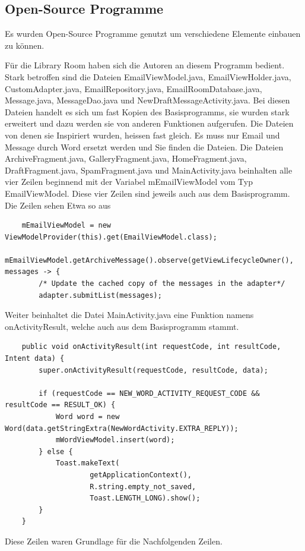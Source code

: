 \documentclass[a4paper,11pt]{article}
\begin{document}
\clearpage
\printglossary

\newpage
\printbibliography[heading=bibnumbered, title={Literaturverzeichnis}]

\begin{appendices}
\subsection{Open-Source Programme}
Es wurden Open-Source Programme genutzt um verschiedene Elemente einbauen zu können. 

Für die Library Room haben sich die Autoren an diesem Programm bedient. \cite{roomApp}
Stark betroffen sind die Dateien EmailViewModel.java, EmailViewHolder.java, CustomAdapter.java, EmailRepository.java, EmailRoomDatabase.java, Message.java, MessageDao.java
und NewDraftMessageActivity.java. Bei diesen
Dateien handelt es sich um fast Kopien des Basisprogramms, sie wurden stark erweitert und dazu werden sie von anderen Funktionen aufgerufen. 
Die Dateien von denen sie Inspiriert wurden, heissen fast gleich. Es muss nur Email und Message durch Word ersetzt werden und Sie finden die Dateien.
Die Dateien ArchiveFragment.java, GalleryFragment.java, HomeFragment.java, DraftFragment.java, SpamFragment.java und MainActivity.java beinhalten alle vier Zeilen beginnend mit der 
Variabel mEmailViewModel vom Typ EmailViewModel. Diese vier Zeilen sind jeweils auch aus dem Basisprogramm. 
Die Zeilen sehen Etwa so aus
\lstset{language=java}
\begin{lstlisting}
    mEmailViewModel = new ViewModelProvider(this).get(EmailViewModel.class);
    mEmailViewModel.getArchiveMessage().observe(getViewLifecycleOwner(), messages -> {
        /* Update the cached copy of the messages in the adapter*/
        adapter.submitList(messages);

\end{lstlisting}


Weiter beinhaltet die Datei MainActivity.java eine Funktion namens onActivityResult, welche auch aus dem Basisprogramm stammt. 
    \lstset{language=java}
    \begin{lstlisting}
    public void onActivityResult(int requestCode, int resultCode, Intent data) {
        super.onActivityResult(requestCode, resultCode, data);

        if (requestCode == NEW_WORD_ACTIVITY_REQUEST_CODE && resultCode == RESULT_OK) {
            Word word = new Word(data.getStringExtra(NewWordActivity.EXTRA_REPLY));
            mWordViewModel.insert(word);
        } else {
            Toast.makeText(
                    getApplicationContext(),
                    R.string.empty_not_saved,
                    Toast.LENGTH_LONG).show();
        }
    }
    \end{lstlisting}
Diese Zeilen waren Grundlage für die Nachfolgenden Zeilen.


\end{appendices}
\end{document}
